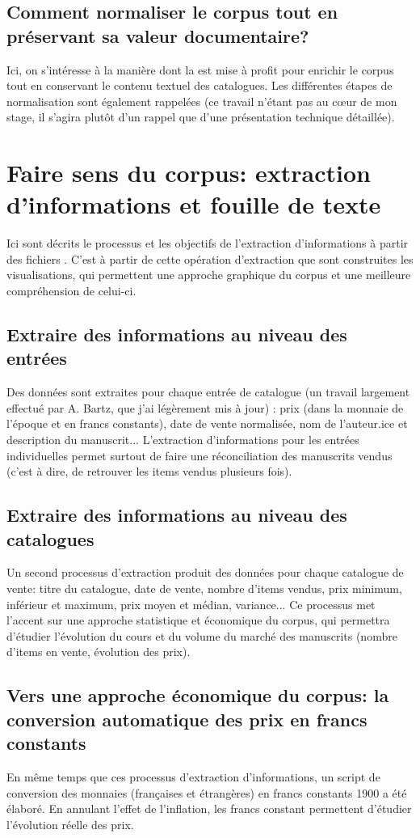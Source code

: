 \subsection{Comment normaliser le corpus tout en préservant sa valeur documentaire?}
Ici, on s'intéresse à la manière dont la \tei{} est mise à profit pour enrichir le corpus tout en conservant le contenu textuel des catalogues. Les différentes étapes de normalisation sont également rappelées (ce travail n'étant pas au cœur de mon stage, il s'agira plutôt d'un rappel que d'une présentation technique détaillée).

\section{Faire sens du corpus: extraction d'informations et fouille de texte}
Ici sont décrits le processus et les objectifs de l'extraction d'informations à partir des fichiers \tei{}. C'est à partir de cette opération d'extraction que sont construites les visualisations, qui permettent une approche graphique du corpus et une meilleure compréhension de celui-ci.

\subsection{Extraire des informations au niveau des entrées}
Des données sont extraites pour chaque entrée de catalogue (un travail largement effectué par A. Bartz, que j'ai légèrement mis à jour) : prix (dans la monnaie de l'époque et en francs constants), date de vente normalisée, nom de l'auteur.ice et description du manuscrit... L'extraction d'informations pour les entrées individuelles permet surtout de faire une réconciliation des manuscrits vendus (c'est à dire, de retrouver les items vendus plusieurs fois).

\subsection{Extraire des informations au niveau des catalogues}
Un second processus d'extraction produit des données pour chaque catalogue de vente: titre du catalogue, date de vente, nombre d'items vendus, prix minimum, inférieur et maximum, prix moyen et médian, variance... Ce processus met l'accent sur une approche statistique et économique du corpus, qui permettra d'étudier l'évolution du cours et du volume du marché des manuscrits (nombre d'items en vente, évolution des prix).

\subsection{Vers une approche économique du corpus: la conversion automatique des prix en francs constants}
En même temps que ces processus d'extraction d'informations, un script de conversion des monnaies (françaises et étrangères) en francs constants 1900 a été élaboré. En annulant l'effet de l'inflation, les francs constant permettent d'étudier l'évolution réelle des prix.


